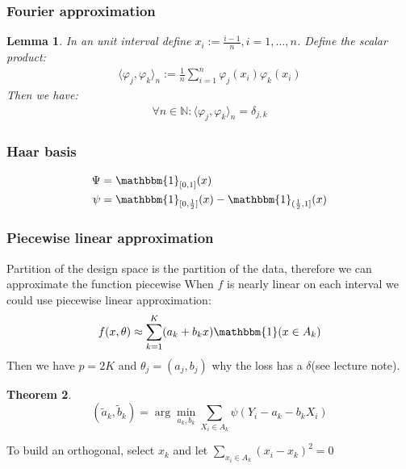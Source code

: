 \documentclass[a4paper,12pt, oneside, fleqn]{book}
\newtheorem{theorem}{Theorem}[section]
\newtheorem{lemma}[theorem]{Lemma}
\theoremstyle{definition}
\theoremstyle{remark}
\begin{document}
\subsubsection*{Fourier approximation}
\begin{lemma}
	In an unit interval define $x_i := \frac{i - 1}{n}, i = 1, \dots, n$. Define the scalar product:
	\begin{align*}
		\langle \varphi_j, \varphi_k \rangle_n := \frac{1}{n} \sum_{i = 1}^n \varphi_j(x_i) \varphi_k(x_i)
	\end{align*}
	Then we have:
	\begin{align*}
		\forall n \in \mathbb{N}: \langle \varphi_j, \varphi_k \rangle_n = \delta_{j,k}
	\end{align*}
\end{lemma}

\subsubsection*{Haar basis}
\begin{align*}
	\Psi &= \mathbbm{1}_{[0, 1]}(x) \\
	\psi &= \mathbbm{1}_{[0, \frac{1}{2}]}(x) - \mathbbm{1}_{(\frac{1}{2}, 1]}(x)
\end{align*}

\subsubsection*{Piecewise linear approximation}
Partition of the design space is the partition of the data, therefore we can approximate the function piecewise
When $f$ is nearly linear on each interval we could use piecewise linear approximation:
\begin{equation}
	f(x, \theta) \approx \sum_{k = 1}^K (a_k + b_k x) \mathbbm{1}(x \in A_k)
\end{equation}
Then we have $p = 2K$ and $\theta_j = (a_j, b_j)$
why the loss has a $\delta$(see lecture note).

\begin{theorem}
	\begin{equation*}
		(\tilde{a}_k, \tilde{b}_k) = \arg \min_{a_k, b_k} \sum_{X_i \in A_k} \psi(Y_i - a_k - b_kX_i)
	\end{equation*}
\end{theorem}
To build an orthogonal, select $x_k$ and let $\sum_{x_i \in A_k}(x_i - x_k)^2 = 0$
\end{document}
